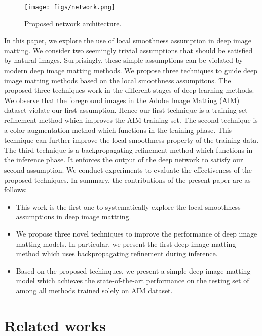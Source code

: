 \documentclass{article}
\theoremstyle{plain}
\begin{document}
\begin{figure*}[t]
  \centering
  \texttt{[image: figs/network.png]}
  \caption{Proposed network architecture.}
  \label{fig:1}
\end{figure*}
In this paper, we explore the use of local smoothness assumption 
in deep image matting.
We consider two seemingly trivial assumptions that should be satisfied by natural images.
Surprisingly, these simple assumptions can be violated by modern deep image matting methods.
We propose three techniques to guide deep image matting methods based on the local smoothness assumpitons.
The proposed three techniques work in the different stages of deep learning methods.
We observe that the foreground images in the Adobe Image Matting (AIM) dataset \cite{Xu2017DeepImageMatting} violate our first assumption.
Hence our first technique is a training set refinement method which improves the AIM training set.
The second technique is a color augmentation method which functions in the training phase.
This technique can further improve the local smoothness property of the training data.
The third technique is a backpropagating refinement method which functions in the inference phase.
It enforces the output of the deep network to satisfy our second assumption.
We conduct experiments to evaluate the effectiveness of the proposed techniques.
In summary, the contributions of the present paper are as follows:
\begin{itemize}
    \item
        This work is the first one to systematically explore the local smoothness assumptions in deep image mattting.
    \item
        We propose three novel techniques to improve the performance of deep image matting models.
        In particular, we present the first deep image matting method which uses backpropagating refinement during inference.
    \item
        Based on the proposed techinques,
        we present a simple deep image matting model which achieves the state-of-the-art performance on the testing set of \cite{Xu2017DeepImageMatting} among all methods trained solely on AIM dataset.
\end{itemize}








\section{Related works}
\end{document}
